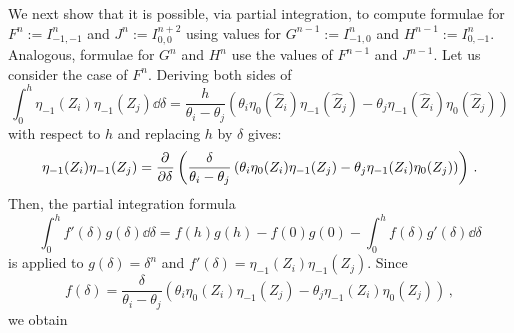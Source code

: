 We next show that it is possible, via partial integration, to compute formulae for $F^{n}:=I_{-1,-1}^{n}$ and $J^{n}:=I_{0,0}^{n+2}$ using values for $G^{n-1}:=I_{-1,0}^{n}$ and $H^{n-1}:=I_{0,-1}^{n}$. Analogous, formulae for $G^{n}$ and $H^{n}$ use the values of $F^{n-1}$ and $J^{n-1}$. Let us consider the case of $F^{n}$. Deriving both sides of
$$
  \int^{h}_0 \eta_{-1}(Z_i)\eta_{-1}(Z_j)\dd \delta = \frac{h}{\theta_i - \theta_j}\left(\theta_i \eta_0(\hat{Z}_i)\eta_{-1}(\hat{Z}_j) - \theta_j \eta_{-1}(\hat{Z}_i)\eta_0(\hat{Z}_j)\right)
$$
with respect to $h$ and replacing $h$ by $\delta$ gives:
$$
  \eta_{-1}(Z_i)\eta_{-1}(Z_j) = \pdv[]{}{\delta}\left(\frac{\delta}{\theta_i - \theta_j}\left(\theta_i \eta_0(Z_i)\eta_{-1}(Z_j) - \theta_j \eta_{-1}(Z_i)\eta_0(Z_j)\right)\right) \,.
$$
Then, the partial integration formula
$$
  \int_{0}^h f'(\delta)g(\delta) \dd \delta = f(h)g(h) - f(0)g(0) - \int_0^{h} f(\delta) g'(\delta) \dd \delta
$$
is applied to $g(\delta) = \delta^{n}$ and $f'(\delta) = \eta_{-1}(Z_i)\eta_{-1}(Z_j)$. Since
$$
  f(\delta) = \frac{\delta}{\theta_i - \theta_j}\left(\theta_i \eta_0(Z_i)\eta_{-1}(Z_j) - \theta_j \eta_{-1}(Z_i)\eta_0(Z_j)\right)\,,
$$
we obtain

